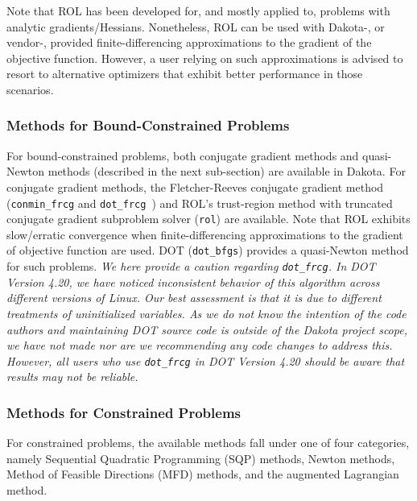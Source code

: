 Note that ROL has been developed for, and mostly applied to, problems 
with analytic gradients/Hessians. Nonetheless, ROL can be used with 
Dakota-, or vendor-, provided finite-differencing approximations to the 
gradient of the objective function. However, a user relying on such 
approximations is advised to resort to alternative optimizers that 
exhibit better performance in those scenarios.

\subsubsection{Methods for Bound-Constrained Problems}
\label{opt:methods:gradient:bound_constrained}

For bound-constrained problems, both conjugate gradient methods and 
quasi-Newton methods (described in the next sub-section) are available 
in Dakota. For conjugate gradient methods, the Fletcher-Reeves 
conjugate gradient method (\texttt{conmin\_frcg} and 
\texttt{dot\_frcg}~\cite{Van95}) and ROL's trust-region method with 
truncated conjugate gradient subproblem solver (\texttt{rol}) are 
available. Note that ROL exhibits slow/erratic convergence 
when finite-differencing approximations to the gradient of objective 
function are used. DOT (\texttt{dot\_bfgs}) provides a quasi-Newton 
method for such problems. \emph{We here provide a caution regarding 
\texttt{dot\_frcg}.  In DOT Version 4.20, we have noticed inconsistent 
behavior of this algorithm across different versions of Linux. Our 
best assessment is that it is due to different treatments of 
uninitialized variables. As we do not know the intention of the code 
authors and maintaining DOT source code is outside of the Dakota 
project scope, we have not made nor are we recommending any code 
changes to address this.  However, all users who use 
\texttt{dot\_frcg} in DOT Version 4.20 should be aware that results 
may not be reliable.}


\subsubsection{Methods for Constrained Problems}
\label{opt:methods:gradient:constrained}

For constrained problems, the available methods fall under one of four 
categories, namely Sequential Quadratic Programming (SQP) methods, 
Newton methods, Method of Feasible Directions (MFD) methods, and the 
augmented Lagrangian method.

